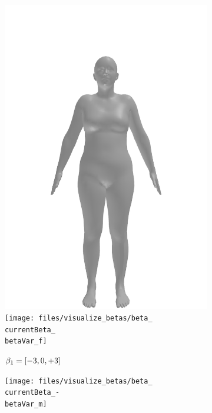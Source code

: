 \begin{figure}[ht!]
\begin{subfigure}{\betaWidth}
        \includegraphics[width=\imgWidth]{files/visualize_betas/baseline_f}
        \texttt{[image: files/visualize\_betas/beta\_\\currentBeta\_\\betaVar\_f]}
        \caption{$\beta_1 = [-3, 0, +3]$}
    \end{subfigure}
    \begin{subfigure}{\betaWidth}
        \def\currentBeta{1}
        \centering
        \texttt{[image: files/visualize\_betas/beta\_\\currentBeta\_-\\betaVar\_m]}

\end{subfigure}
\end{figure}
